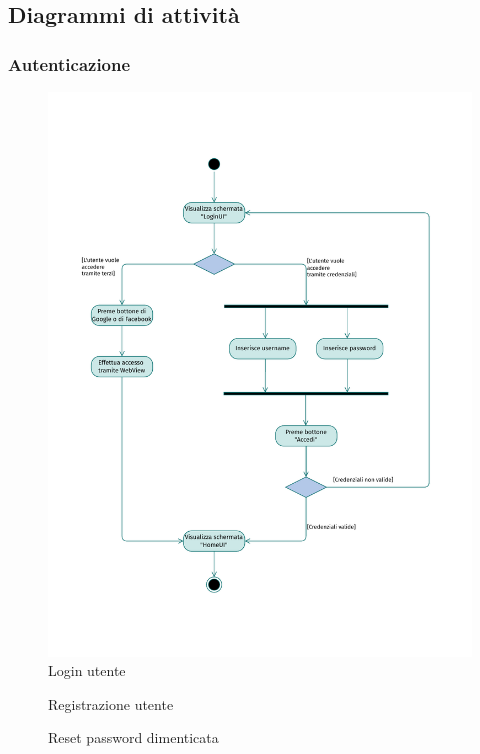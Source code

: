 \documentclass{natourDoc}
\begin{document}
\newpage
\subsection{Diagrammi di attività}
\subsubsection{Autenticazione}
\begin{figure}[!htbp]
	\centering
	\includegraphics[width=\textwidth, page=1]{./diagrams/activity.pdf}
	\caption{Login utente}
\end{figure}
\FloatBarrier

\newpage
\begin{figure}[!htbp]
	\centering
	
	\caption{Registrazione utente}
\end{figure}
\FloatBarrier

\newpage
\begin{figure}[!htbp]
	\centering
	
	\caption{Reset password dimenticata}
\end{figure}
\FloatBarrier
\end{document}
